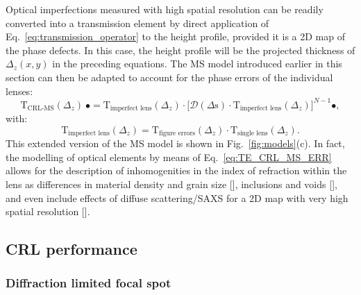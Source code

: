 \begin{refsection}
Optical imperfections measured with high spatial resolution can be readily converted into a transmission element by direct application of Eq.~\ref{eq:transmission_operator} to the height profile, provided it is a 2D map of the phase defects. In this case, the height profile will be the projected thickness of $\Delta_z(x,y)$ in the preceding equations. The MS model introduced earlier in this section can then be adapted to account for the phase errors of the individual lenses:
\begin{equation}\label{eq:TE_CRL_MS_ERR}
    \mathrm{T}_{\text{CRL-MS}}(\Delta_z)~\bullet = \mathrm{T}_{\text{imperfect lens}}(\Delta_z)\cdot\big[\mathcal{D}({\Delta}\text{s})\cdot\mathrm{T}_{\text{imperfect lens}}(\Delta_z)\big]^{N-1}\bullet,
\end{equation}{}
with:
\begin{equation}\label{eq:TE_CRL_single_ERR}
    \mathrm{T}_{\text{imperfect lens}}(\Delta_z) = \mathrm{T}_{\text{figure errors}}(\Delta_z)\cdot\mathrm{T}_{\text{single lens}}(\Delta_z).
\end{equation}{}
This extended version of the MS model is shown in Fig.~\ref{fig:models}(c). In fact, the modelling of optical elements by means of  Eq.~\ref{eq:TE_CRL_MS_ERR} allows for the description of inhomogenities in the index of refraction within the lens as differences in material density and grain size [\cite{Lyatun2020}], inclusions and voids [\cite{Roth2014}], and even include effects of diffuse scattering/SAXS for a 2D map with very high spatial resolution [\cite{Paganin2019}].

\subsection{CRL performance}\label{sec:CRL_performance}

\subsubsection*{Diffraction limited focal spot}


\end{refsection}
